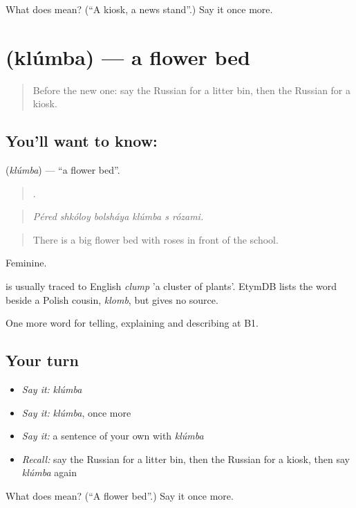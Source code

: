 \begin{tcolorbox}[breakable,colback=teal!4,colframe=teal!35!black,title={Before you move on}]
What does  mean? (\textquotedblleft{}A kiosk, a news stand\textquotedblright{}.) Say it once more.
\end{tcolorbox}
\section[\texorpdfstring{\ru{клумба} (klúmba)}{клумба (klúmba)}]{ (klúmba) — a flower bed}

\label{lesson:RU-C445-klumba}



\begin{quote}
Before the new one: say the Russian for a litter bin, then the Russian for a kiosk.
\end{quote}

\subsection*{You'll want to know: }
\textbf{} (\emph{klúmba}) — \textquotedblleft{}a flower bed\textquotedblright{}.

\begin{quote}
     .
\end{quote}

\begin{quote}
\emph{Péred shkóloy bolsháya klúmba s rózami.}
\end{quote}

\begin{quote}
There is a big flower bed with roses in front of the school.
\end{quote}

Feminine.

\begin{cousinweb}
\emph{} is usually traced to English \emph{clump} 'a cluster of plants'. EtymDB lists the word beside a Polish cousin, \emph{klomb}, but gives no source.
\end{cousinweb}

\begin{grammarlens}[title={What you've built}]
One more word for telling, explaining and describing at B1.
\end{grammarlens}

\subsection*{Your turn}
\begin{itemize}
\raggedright
  \item \emph{Say it:} \emph{klúmba}
  \item \emph{Say it:} \emph{klúmba}, once more
  \item \emph{Say it:} a sentence of your own with \emph{klúmba}
  \item \emph{Recall:} say the Russian for a litter bin, then the Russian for a kiosk, then say \emph{klúmba} again
\end{itemize}

\begin{tcolorbox}[breakable,colback=teal!4,colframe=teal!35!black,title={Before you move on}]
What does  mean? (\textquotedblleft{}A flower bed\textquotedblright{}.) Say it once more.
\end{tcolorbox}
